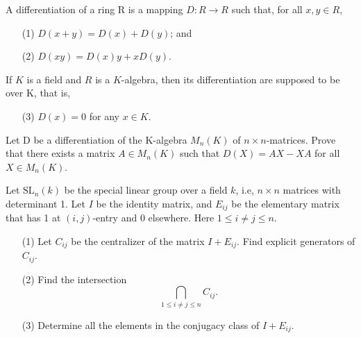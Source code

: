 \begin{prob}[F2008-Q4]
    A differentiation of a ring R is a mapping \(D:R\to R\) such that, for all \(x,y\in R\),
    \begin{itemize}
        \item[(1)] \(D(x+y) = D(x) + D(y)\); and
        \item[(2)] \(D(xy) = D(x)y + xD(y)\).
    \end{itemize}
    If \(K\) is a field and \(R\) is a \(K\)-algebra, then its differentiation are supposed to be over K, that is,
    \begin{itemize}
        \item[(3)] \(D(x) = 0\) for any \(x \in K\).
    \end{itemize}
    Let D be a differentiation of the K-algebra \(M_n(K)\) of \(n \times n\)-matrices. Prove that there exists a matrix \(A \in M_n(K)\) such that \(D(X) = AX - XA\) for all \(X \in M_n(K)\).
\end{prob}


\begin{prob}[F2006-Q1]
    Let \(\text{SL}_n(k)\) be the special linear group over a field \(k\), i.e, \(n \times n\) matrices with determinant 1. Let \(I\) be the identity matrix, and \(E_{ij}\) be the elementary matrix that has 1 at \((i,j)\)-entry and 0 elsewhere. Here \(1 \leq i \neq j \leq n\).
    \begin{itemize}
        \item[(1)] Let \(C_{ij}\) be the centralizer of the matrix \(I + E_{ij}\). Find explicit generators of \(C_{ij}\).
        \item[(2)] Find the intersection
        \[\bigcap_{1 \leq i \neq j \leq n} C_{ij}.\]
        \item[(3)] Determine all the elements in the conjugacy class of \(I + E_{ij}\).
    \end{itemize}
\end{prob}


